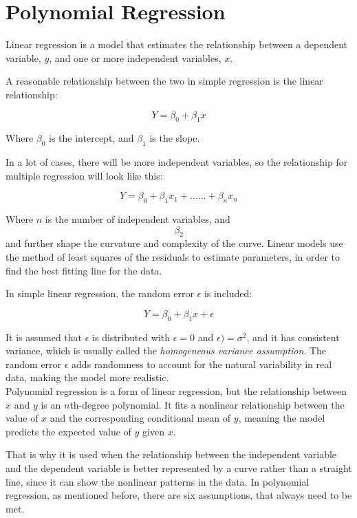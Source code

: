 
\section*{Polynomial Regression}
Linear regression is a model that estimates the relationship between a dependent variable, \( y \), and one or more independent variables, \( x \).

A reasonable relationship between the two in simple regression is the linear relationship:

\[
Y = \beta_0 + \beta_1 x
\]

Where \( \beta_0 \) is the intercept, and \( \beta_1 \) is the slope.

In a lot of cases, there will be more independent variables, so the relationship for multiple regression will look like this:

\[
Y = \beta_0 + \beta_1 x_1 + ......+ \beta_n x_n
\]



Where \( n \) is the number of independent variables, and $$\beta_2$$ and further shape the curvature and complexity of the curve. Linear models use the method of least squares of the residuals to estimate parameters, in order to find the best fitting line for the data.

In simple linear regression, the random error \( \epsilon \) is included:

\[
Y = \beta_0 + \beta_1 x + \epsilon
\]

It is assumed that \( \epsilon \) is distributed with $\epsilon = 0$ and $\epsilon) = \sigma^2$, and it has consistent variance, which is usually called the \textit{homogeneous variance assumption}. The random error \( \epsilon \) adds randomness to account for the natural variability in real data, making the model more realistic.
\newline\\
Polynomial regression is a form of linear regression, but the relationship between \( x \) and \( y \) is an \( n \)th-degree polynomial. It fits a nonlinear relationship between the value of \( x \) and the corresponding conditional mean of \( y \), meaning the model predicts the expected value of \( y \) given \( x \).

That is why it is used when the relationship between the independent variable and the dependent variable is better represented by a curve rather than a straight line, since it can show the nonlinear patterns in the data.
In polynomial regression, as mentioned before, there are six assumptions, that always need to be met.

